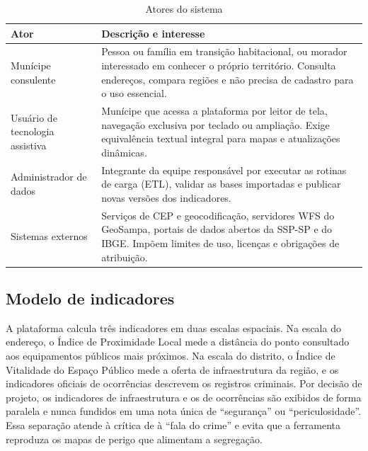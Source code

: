 \begin{table}[htb]
	\caption{Atores do sistema}
	\label{qua:atores}
	\centering
	\small
	\begin{tabularx}{\textwidth}{L{3.6cm}X}
		\toprule
		\textbf{Ator}                   & \textbf{Descrição e interesse}                                                                                                                                                            \\
		\midrule
		Munícipe consulente             & Pessoa ou família em transição habitacional, ou morador interessado em conhecer o próprio território. Consulta endereços, compara regiões e não precisa de cadastro para o uso essencial. \\
		Usuário de tecnologia assistiva & Munícipe que acessa a plataforma por leitor de tela, navegação exclusiva por teclado ou ampliação. Exige equivalência textual integral para mapas e atualizações dinâmicas.               \\
		Administrador de dados          & Integrante da equipe responsável por executar as rotinas de carga (ETL), validar as bases importadas e publicar novas versões dos indicadores.                                            \\
		Sistemas externos               & Serviços de CEP e geocodificação, servidores WFS do GeoSampa, portais de dados abertos da SSP-SP e do IBGE. Impõem limites de uso, licenças e obrigações de atribuição.                   \\
		\bottomrule
	\end{tabularx}
\end{table}

\subsection{Modelo de indicadores}

A plataforma calcula três indicadores em duas escalas espaciais. Na escala do endereço, o Índice de Proximidade Local mede a distância do ponto consultado aos equipamentos públicos mais próximos. Na escala do distrito, o Índice de Vitalidade do Espaço Público mede a oferta de infraestrutura da região, e os indicadores oficiais de ocorrências descrevem os registros criminais. Por decisão de projeto, os indicadores de infraestrutura e os de ocorrências são exibidos de forma paralela e nunca fundidos em uma nota única de ``segurança'' ou ``periculosidade''. Essa separação atende à crítica de  à ``fala do crime'' e evita que a ferramenta reproduza os mapas de perigo que alimentam a segregação.

